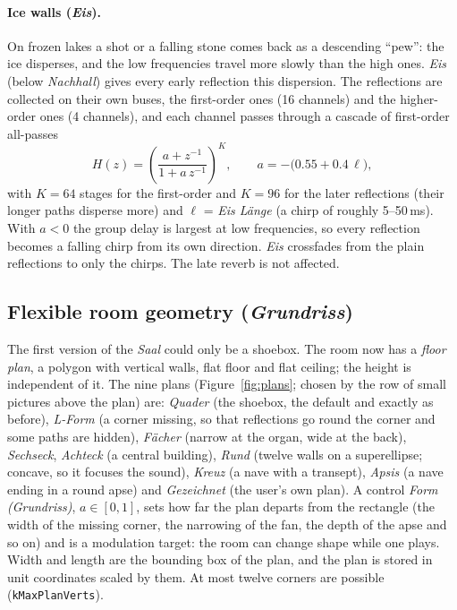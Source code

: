 \documentclass[11pt,a4paper,parskip=half,DIV=11,toc=bibliography]{scrartcl}
\newcommand{\ui}[1]{\emph{#1}}                 %
\newcommand{\fn}[1]{\mbox{\texttt{#1}}}
\begin{document}
\paragraph{Ice walls (\ui{Eis}).} On frozen lakes a shot or a falling stone comes back as a descending
\enquote{pew}: the ice disperses, and the low frequencies travel more slowly than the high ones. \ui{Eis} (below
\ui{Nachhall}) gives every early reflection this dispersion. The reflections are collected on their own buses, the
first-order ones (16 channels) and the higher-order ones (4 channels), and each channel passes through a cascade of
first-order all-passes
\begin{equation}
  H(z)=\left(\frac{a+z^{-1}}{1+a\,z^{-1}}\right)^{\!K},\qquad a=-\bigl(0.55+0.4\,\ell\bigr),
\end{equation}
with $K=64$ stages for the first-order and $K=96$ for the later reflections (their longer paths disperse more) and
$\ell$ = \ui{Eis Länge} (a chirp of roughly 5--50\,ms). With $a<0$ the group delay is largest at low frequencies, so
every reflection becomes a falling chirp from its own direction. \ui{Eis} crossfades from the plain reflections to only the
chirps. The late reverb is not affected.

\subsection{Flexible room geometry (\ui{Grundriss})}
\label{sec:plans}
The first version of the \ui{Saal} could only be a shoebox. The room now has a \emph{floor plan}, a polygon with
vertical walls, flat floor and flat ceiling; the height is independent of it. The nine plans
(Figure~\ref{fig:plans}; chosen by the row of small pictures above the plan) are:
\ui{Quader} (the shoebox, the default and exactly as before), \ui{L-Form} (a corner missing, so that reflections
go round the corner and some paths are hidden), \ui{Fächer} (narrow at the organ, wide at the back),
\ui{Sechseck}, \ui{Achteck} (a central building), \ui{Rund} (twelve walls on a superellipse; concave, so it
focuses the sound), \ui{Kreuz} (a nave with a transept), \ui{Apsis} (a nave ending in a round apse) and
\ui{Gezeichnet} (the user's own plan). A control \ui{Form (Grundriss)}, $a\in[0,1]$, sets how far the plan
departs from the rectangle (the width of the missing corner, the narrowing of the fan, the depth of the
apse and so on) and is a modulation target: the room can change shape while one plays. Width and length are the
bounding box of the plan, and the plan is stored in unit coordinates scaled by them. At most twelve corners are
possible (\fn{kMaxPlanVerts}).
\end{document}
